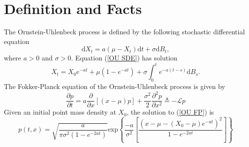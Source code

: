 \documentclass[10pt]{article}
\begin{document}
\section{Definition and Facts}
The Ornstein-Uhlenbeck process is defined by the following stochastic differential equation
\begin{equation} \label{OU SDE}
	\text{d}X_t = a(\mu-X_t)\text{d}t + \sigma\text{d}B_t,
\end{equation}
where $a > 0$ and $\sigma > 0$. Equation (\ref{OU SDE}) has solution
\begin{equation}
	X_t = X_0e^{-at} + \mu\left(1-e^{-at}\right) + \sigma\int_{0}^{t}e^{-a(t-s)}\text{d}B_s.
\end{equation}
The Fokker-Planck equation of the Ornstein-Uhlenbeck process is given by
\begin{equation} \label{OU FP}
	\frac{\partial{}p}{\partial{}t} = a\frac{\partial}{\partial{}x}[(x-\mu)p] + \frac{\sigma^2}{2}\frac{\partial^2p}{\partial{}x^2} \triangleq -\mathcal{L}p
\end{equation}
Given an initial point mass density at $X_0$, the solution to (\ref{OU FP}) is
\begin{equation}
	p(t,x) = \sqrt{\frac{a}{\pi\sigma^2\left(1-e^{-2at}\right)}} \text{exp}\left\{\frac{-a}{\sigma^2}\left[\frac{\left(x-\mu-(X_0-\mu)e^{-a{}t}\right)^2}{1-e^{-2at}}\right]\right\}
\end{equation}
\end{document}
